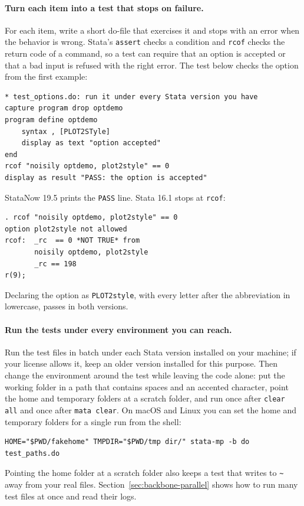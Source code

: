 \paragraph{Turn each item into a test that stops on failure.} For each item, write a short do-file that exercises it and stops with an error when the behavior is wrong. Stata's \texttt{assert} checks a condition and \texttt{rcof} checks the return code of a command, so a test can require that an option is accepted or that a bad input is refused with the right error. The test below checks the option from the first example:
\par
{\footnotesize
\begin{verbatim}
* test_options.do: run it under every Stata version you have
capture program drop optdemo
program define optdemo
    syntax , [PLOT2STyle]
    display as text "option accepted"
end
rcof "noisily optdemo, plot2style" == 0
display as result "PASS: the option is accepted"
\end{verbatim}
}
StataNow 19.5 prints the \texttt{PASS} line. Stata 16.1 stops at \texttt{rcof}:
\par
{\footnotesize
\begin{verbatim}
. rcof "noisily optdemo, plot2style" == 0
option plot2style not allowed
rcof:  _rc  == 0 *NOT TRUE* from
       noisily optdemo, plot2style
       _rc == 198
r(9);
\end{verbatim}
}
Declaring the option as \texttt{PLOT2style}, with every letter after the abbreviation in lowercase, passes in both versions.

\paragraph{Run the tests under every environment you can reach.} Run the test files in batch under each Stata version installed on your machine; if your license allows it, keep an older version installed for this purpose. Then change the environment around the test while leaving the code alone: put the working folder in a path that contains spaces and an accented character, point the home and temporary folders at a scratch folder, and run once after \texttt{clear all} and once after \texttt{mata clear}. On macOS and Linux you can set the home and temporary folders for a single run from the shell:
\par
{\footnotesize
\begin{verbatim}
HOME="$PWD/fakehome" TMPDIR="$PWD/tmp dir/" stata-mp -b do test_paths.do
\end{verbatim}
}
Pointing the home folder at a scratch folder also keeps a test that writes to \texttt{\textasciitilde} away from your real files. Section~\ref{sec:backbone-parallel} shows how to run many test files at once and read their logs.


